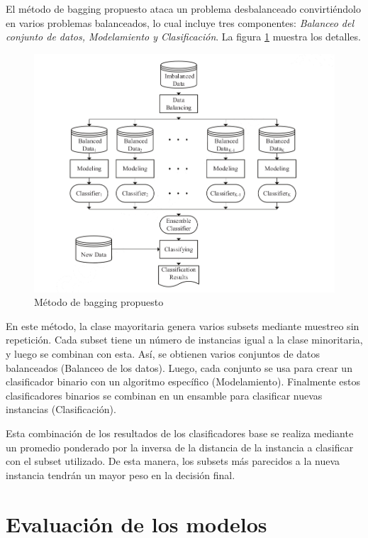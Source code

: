 El método de bagging propuesto \cite{sun2015novel} ataca un problema desbalanceado convirtiéndolo en varios problemas balanceados, lo cual incluye tres componentes: \textit{Balanceo del conjunto de datos, Modelamiento y Clasificación}. La figura \ref{fig:bagging-imbalanced} muestra los detalles.

\begin{figure}
    \centering
    \caption{Método de bagging propuesto}
    \label{fig:bagging-imbalanced}
    \includegraphics[width=\linewidth]{graficos/bagging_imbalanced.png}
\end{figure}

En este método, la clase mayoritaria genera varios subsets mediante muestreo sin repetición. Cada subset tiene un número de instancias igual a la clase minoritaria, y luego se combinan con esta. Así, se obtienen varios conjuntos de datos balanceados (Balanceo de los datos). Luego, cada conjunto se usa para crear un clasificador binario con un algoritmo específico (Modelamiento). Finalmente estos clasificadores binarios se combinan en un ensamble para clasificar nuevas instancias (Clasificación).

Esta combinación de los resultados de los clasificadores base se realiza mediante un promedio ponderado por la inversa de la distancia de la instancia a clasificar con el subset utilizado. De esta manera, los subsets más parecidos a la nueva instancia tendrán un mayor peso en la decisión final.


\section{Evaluación de los modelos}

